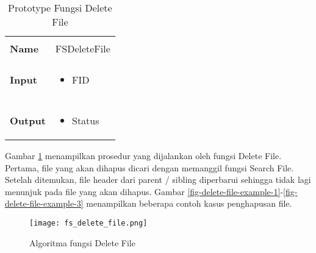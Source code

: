 \documentclass[a4paper, 12pt]{report}
\begin{document}
\begin{table}[hp]
  \centering
  \begin{tabular}{p{2cm} p{8cm}}
    \hline\\
    {\bf Name} & FSDeleteFile\\
    \hline\\
    {\bf Input} & 
    \begin{itemize}[noitemsep,topsep=0pt,parsep=0pt,partopsep=0pt]
    \item FID
    \end{itemize}
    \\
    \hline\\
    {\bf Output} & 
    \begin{itemize}[noitemsep,topsep=0pt,parsep=0pt,partopsep=0pt]
    \item Status
    \end{itemize}
    \\
    \hline
  \end{tabular}
  \caption{Prototype Fungsi Delete File}
  \label{tbl-delete-file}
\end{table}


Gambar \ref{fig-delete-file} menampilkan prosedur yang dijalankan oleh fungsi Delete File. Pertama, file yang akan dihapus dicari dengan memanggil fungsi Search File. Setelah ditemukan, file header dari parent / sibling diperbarui sehingga tidak lagi menunjuk pada file yang akan dihapus. Gambar \ref{fig-delete-file-example-1}-\ref{fig-delete-file-example-3} menampilkan beberapa contoh kasus penghapusan file. 

\begin{figure}
\centering
\texttt{[image: fs\_delete\_file.png]}
\caption{Algoritma fungsi Delete File}
\label{fig-delete-file}
\end{figure}
\end{document}
